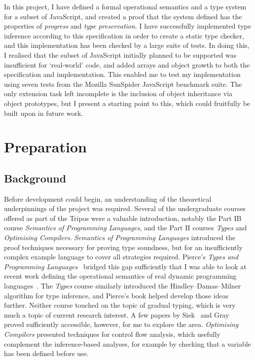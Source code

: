 \documentclass[12pt,a4paper,twoside,openright]{report}
\theoremstyle{definition}
\theoremstyle{dotless}
\begin{document}
In this project, I have defined a formal operational semantics and a type
system for a subset of JavaScript, and created a proof that the system defined
has the properties of \textit{progress} and \textit{type preservation}. I have
successfully implemented type inference according to this specification in
order to create a static type checker, and this implementation has been checked
by a large suite of tests. In doing this, I realised that the subset of
JavaScript initially planned to be supported was insufficient for `real-world'
code, and added arrays and object growth to both the specification and
implementation. This enabled me to test my implementation using seven tests
from the Mozilla SunSpider JavaScript benchmark suite. The only extension task
left incomplete is the inclusion of object inheritance via object prototypes,
but I present a starting point to this, which could fruitfully be built upon in
future work.

\chapter{Preparation}\label{preparation} \section{Background}

Before development could begin, an understanding of the theoretical
underpinnings of the project was required. Several of the undergraduate courses
offered as part of the Tripos were a valuable introduction, notably the Part IB
course \textit{Semantics of Programming Languages}, and the Part II courses
\textit{Types} and \textit{Optimising Compilers}. \textit{Semantics of
  Programming Languages} introduced the proof techniques necessary for proving
type soundness, but for an insufficiently complex example language to cover all
strategies required. Pierce's \textit{Types and Programming
  Languages}~\cite{pierce} bridged this gap sufficiently that I was able to look
at recent work defining the operational semantics of real dynamic programming
languages~\cite{pythonOpSem}. The \textit{Types} course similarly introduced
the Hindley--Damas--Milner algorithm for type inference, and Pierce's book
helped develop those ideas further. Neither course touched on the topic of
gradual typing, which is very much a topic of current research interest. A few
papers by Siek~\cite{gradSiek, gradSiek2} and Gray~\cite{gradGray} proved
sufficiently accessible, however, for me to explore the area.
\textit{Optimising Compilers} presented techniques for control flow analysis,
which usefully complement the inference-based analyses, for example by checking
that a variable has been defined before use.
\end{document}
